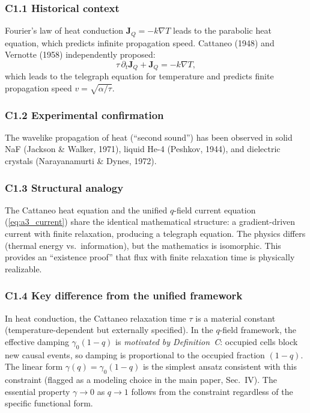 \documentclass[reprint]{revtex4-2}
\begin{document}
\subsubsection{C1.1 Historical context}

Fourier's law of heat conduction $\mathbf{J}_Q = -k\nabla T$ leads to the parabolic heat equation, which predicts infinite propagation speed. Cattaneo (1948) and Vernotte (1958) independently proposed:
\begin{equation}
\tau\,\partial_t\mathbf{J}_Q + \mathbf{J}_Q = -k\nabla T,
\end{equation}
which leads to the telegraph equation for temperature and predicts finite propagation speed $v = \sqrt{\alpha/\tau}$.

\subsubsection{C1.2 Experimental confirmation}

The wavelike propagation of heat (``second sound'') has been observed in solid NaF (Jackson \& Walker, 1971), liquid He-4 (Peshkov, 1944), and dielectric crystals (Narayanamurti \& Dynes, 1972).

\subsubsection{C1.3 Structural analogy}

The Cattaneo heat equation and the unified $q$-field current equation (\ref{eq:a3_current}) share the identical mathematical structure: a gradient-driven current with finite relaxation, producing a telegraph equation. The physics differs (thermal energy vs.\ information), but the mathematics is isomorphic. This provides an ``existence proof'' that flux with finite relaxation time is physically realizable.

\subsubsection{C1.4 Key difference from the unified framework}

In heat conduction, the Cattaneo relaxation time $\tau$ is a material constant (temperature-dependent but externally specified). In the $q$-field framework, the effective damping $\gamma_0(1-q)$ is \emph{motivated by Definition~C}: occupied cells block new causal events, so damping is proportional to the occupied fraction $(1-q)$. The linear form $\gamma(q)=\gamma_0(1-q)$ is the simplest ansatz consistent with this constraint (flagged as a modeling choice in the main paper, Sec.~IV). The essential property $\gamma\to0$ as $q\to1$ follows from the constraint regardless of the specific functional form.
\end{document}
